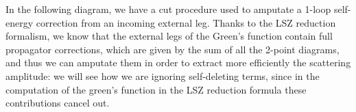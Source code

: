 \begin{example}
    In the following diagram, we have a cut procedure used to amputate a 1-loop self-energy correction from an incoming external leg. Thanks to the LSZ reduction formalism, we know that the external legs of the Green's function contain full propagator corrections, which are given by the sum of all the 2-point diagrams, and thus we can amputate them in order to extract more efficiently the scattering amplitude: we will see how we are ignoring self-deleting terms, since in the computation of the green's function in the LSZ reduction formula these contributions cancel out.
    \begin{figure}[H]
        \begin{minipage}{0.5\textwidth}
            \centering
\end{minipage}
\end{figure}
\end{example}
